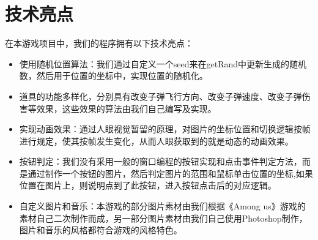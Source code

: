 \section{技术亮点}
在本游戏项目中，我们的程序拥有以下技术亮点：
\begin{itemize}
    \item 使用随机位置算法：我们通过自定义一个seed来在getRand中更新生成的随机数，然后用于位置的坐标中，实现位置的随机化。
    \item 道具的功能多样化，分别具有改变子弹飞行方向、改变子弹速度、改变子弹伤害等效果，这些效果的算法由我们自己编写及实现。
    \item 实现动画效果：通过人眼视觉暂留的原理，对图片的坐标位置和切换逻辑按帧进行规定，使其按帧发生变化，从而人眼获取到的就是动态的动画效果。
    \item 按钮判定：我们没有采用一般的窗口编程的按钮实现和点击事件判定方法，而是通过制作一个按钮的图片，然后判定图片的范围和鼠标单击位置的坐标,如果位置在图片上，则说明点到了此按钮，进入按钮点击后的对应逻辑。
    \item 自定义图片和音乐：本游戏的部分图片素材由我们根据《Among us》游戏的素材自己二次制作而成，另一部分图片素材由我们自己使用Photoshop制作，图片和音乐的风格都符合游戏的风格特色。
\end{itemize}


